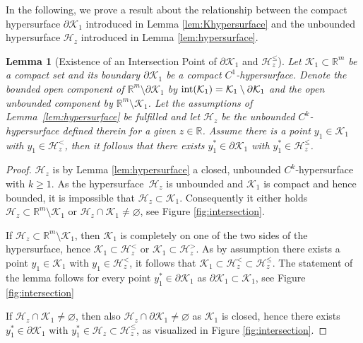 \documentclass[10pt]{article}
\numberwithin{equation}{section}
\newtheorem{lemma}[theorem]{Lemma}
\begin{document}
	In the following, we prove a result about the relationship between the compact hypersurface $\partial \mathcal{K}_1$ introduced in Lemma \ref{lem:Khypersurface} and the unbounded hypersurface $\mathcal{H}_z$ introduced in Lemma \ref{lem:hypersurface}.
	
	\begin{lemma}[Existence of an Intersection Point of $\partial \mathcal{K}_1$ and $\mathcal{H}^{\leq}_{z}$] \label{lem:intersectionpoint}
		Let $\mathcal{K}_1\subset \mathbb{R}^m$ be a compact set and its boundary $\partial\mathcal{K}_1$ be a compact $C^1$-hypersurface. Denote the bounded open component of $\mathbb{R}^m\setminus \partial \mathcal{K}_1$ by $\textup{int}(\mathcal{K}_1) = \mathcal{K}_1\setminus \partial \mathcal{K}_1$ and the open unbounded component by $\mathbb{R}^m\setminus \mathcal{K}_1$. Let the assumptions of Lemma~\ref{lem:hypersurface} be fulfilled and let $\mathcal{H}_z$ be the unbounded $C^k$-hypersurface defined therein for a given $z\in\mathbb{R}$. Assume there is a point $y_1\in\mathcal{K}_1$ with $y_1 \in \mathcal{H}^{<}_{z}$, then it follows that there exists $y_1^\ast \in \partial \mathcal{K}_1$ with $y_1^\ast \in \mathcal{H}^{\leq}_{z}$. 	
	\end{lemma}
	
	\begin{proof}
		$\mathcal{H}_{z}$ is by Lemma \ref{lem:hypersurface} a closed, unbounded $C^k$-hypersurface with $k \geq 1$. As the hypersurface~$\mathcal{H}_{z}$ is unbounded and $\mathcal{K}_1$ is compact and hence bounded, it is impossible that $\mathcal{H}_{z} \subset \mathcal{K}_1$. Consequently it either holds  $\mathcal{H}_{z} \subset \mathbb{R}^m\setminus\mathcal{K}_1$ or  $\mathcal{H}_{z} \cap \mathcal{K}_1 \neq \varnothing$, see Figure \ref{fig:intersection}.
		
		If $\mathcal{H}_{z} \subset \mathbb{R}^m \setminus \mathcal{K}_1$, then $\mathcal{K}_1$ is completely on one of the two sides of the hypersurface, hence $\mathcal{K}_1 \subset \mathcal{H}_{z}^{<}$ or $\mathcal{K}_1 \subset \mathcal{H}_{z}^{>}$. As by assumption there exists  a point $y_1\in\mathcal{K}_1$ with $y_1 \in \mathcal{H}^{<}_{z}$, it follows that $\mathcal{K}_1 \subset \mathcal{H}_{z}^{<} \subset \mathcal{H}_{z}^{\leq}$. The statement of the lemma follows for every point $y^\ast_1\in\partial \mathcal{K}_1$ as $\partial \mathcal{K}_1 \subset \mathcal{K}_1$, see Figure \ref{fig:intersection}
		
		If $\mathcal{H}_{z} \cap \mathcal{K}_1 \neq \varnothing$, then also  $\mathcal{H}_{z} \cap \partial\mathcal{K}_1 \neq \varnothing$ as $\mathcal{K}_1$ is closed, hence there exists $y^\ast_1\in\partial \mathcal{K}_1$ with $y_1^\ast \in \mathcal{H}_{z}\subset \mathcal{H}_{z}^{\leq}$, as visualized in Figure \ref{fig:intersection}.
	\end{proof}
	
\end{document}

